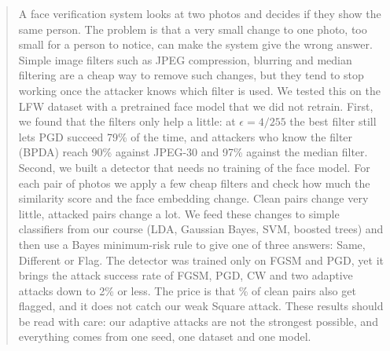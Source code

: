 \begin{abstract}
A face verification system looks at two photos and decides if they show the same person. The problem is that a very small change to one photo, too small for a person to notice, can make the system give the wrong answer. Simple image filters such as JPEG compression, blurring and median filtering are a cheap way to remove such changes, but they tend to stop working once the attacker knows which filter is used. We tested this on the LFW dataset with a pretrained face model that we did not retrain. First, we found that the filters only help a little: at $\epsilon{=}4/255$ the best filter still lets PGD succeed 79\% of the time, and attackers who know the filter (BPDA) reach 90\% against JPEG-30 and 97\% against the median filter. Second, we built a detector that needs no training of the face model. For each pair of photos we apply a few cheap filters and check how much the similarity score and the face embedding change. Clean pairs change very little, attacked pairs change a lot. We feed these changes to simple classifiers from our course (LDA, Gaussian Bayes, SVM, boosted trees) and then use a Bayes minimum-risk rule to give one of three answers: Same, Different or Flag. The detector was trained only on FGSM and PGD, yet it brings the attack success rate of FGSM, PGD, CW and two adaptive attacks down to 2\% or less. The price is that \cleanflag\% of clean pairs also get flagged, and it does not catch our weak Square attack. These results should be read with care: our adaptive attacks are not the strongest possible, and everything comes from one seed, one dataset and one model.
\end{abstract}
